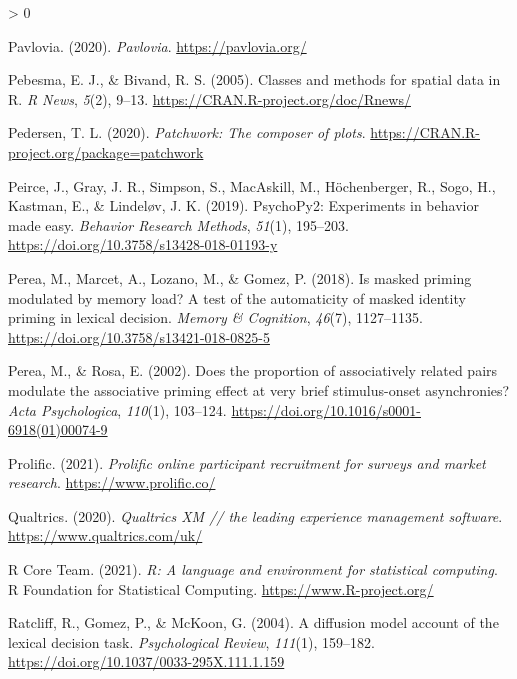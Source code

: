 \documentclass[
  english,
  man,floatsintext]{apa6}
\newlength{\cslhangindent}
\newenvironment{CSLReferences}[2] %
 {%
  \setlength{\parindent}{0pt}
  \ifodd #1 \everypar{\setlength{\hangindent}{\cslhangindent}}\ignorespaces\fi
  \ifnum #2 > 0
  \setlength{\parskip}{#2\baselineskip}
  \fi
 }%
 {}
\begin{document}
\begin{CSLReferences}{1}{0}
\leavevmode\hypertarget{ref-pavlovia2020}{}%
Pavlovia. (2020). \emph{Pavlovia}. \url{https://pavlovia.org/}

\leavevmode\hypertarget{ref-R-sp}{}%
Pebesma, E. J., \& Bivand, R. S. (2005). Classes and methods for spatial data in {R}. \emph{R News}, \emph{5}(2), 9--13. \url{https://CRAN.R-project.org/doc/Rnews/}

\leavevmode\hypertarget{ref-R-patchwork}{}%
Pedersen, T. L. (2020). \emph{Patchwork: The composer of plots}. \url{https://CRAN.R-project.org/package=patchwork}

\leavevmode\hypertarget{ref-peirce2019}{}%
Peirce, J., Gray, J. R., Simpson, S., MacAskill, M., Höchenberger, R., Sogo, H., Kastman, E., \& Lindeløv, J. K. (2019). PsychoPy2: Experiments in behavior made easy. \emph{Behavior Research Methods}, \emph{51}(1), 195--203. \url{https://doi.org/10.3758/s13428-018-01193-y}

\leavevmode\hypertarget{ref-Perea_2018}{}%
Perea, M., Marcet, A., Lozano, M., \& Gomez, P. (2018). Is masked priming modulated by memory load? A test of the automaticity of masked identity priming in lexical decision. \emph{Memory {\&} Cognition}, \emph{46}(7), 1127--1135. \url{https://doi.org/10.3758/s13421-018-0825-5}

\leavevmode\hypertarget{ref-perea2002does}{}%
Perea, M., \& Rosa, E. (2002). Does the proportion of associatively related pairs modulate the associative priming effect at very brief stimulus-onset asynchronies? \emph{Acta Psychologica}, \emph{110}(1), 103--124. \url{https://doi.org/10.1016/s0001-6918(01)00074-9}

\leavevmode\hypertarget{ref-prolific2021}{}%
Prolific. (2021). \emph{Prolific \textbar{} online participant recruitment for surveys and market research}. \url{https://www.prolific.co/}

\leavevmode\hypertarget{ref-qualtrics2020}{}%
Qualtrics. (2020). \emph{Qualtrics XM // the leading experience management software}. \url{https://www.qualtrics.com/uk/}

\leavevmode\hypertarget{ref-R-base}{}%
R Core Team. (2021). \emph{R: A language and environment for statistical computing}. R Foundation for Statistical Computing. \url{https://www.R-project.org/}

\leavevmode\hypertarget{ref-ratcliff2004}{}%
Ratcliff, R., Gomez, P., \& McKoon, G. (2004). A diffusion model account of the lexical decision task. \emph{Psychological Review}, \emph{111}(1), 159--182. \url{https://doi.org/10.1037/0033-295X.111.1.159}


\end{CSLReferences}
\end{document}
